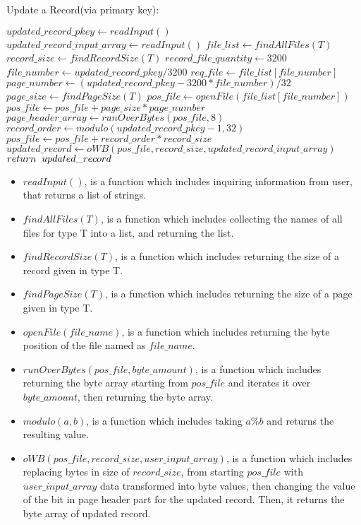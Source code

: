 \documentclass[12pt]{report}
\begin{document}
\begin{algorithm}
\caption{Update a Record(via primary key):}
\begin{algorithmic}[1]
	\STATE $updated\_record\_pkey \leftarrow readInput()$
	\STATE $updated\_record\_input\_array \leftarrow readInput()$
	\STATE $file\_list \leftarrow findAllFiles(T)$
	\STATE $record\_size \leftarrow findRecordSize(T)$
	\STATE $record\_file\_quantity \leftarrow 3200$
	\STATE $file\_number \leftarrow updated\_record\_pkey / 3200$
	\STATE $req\_file \leftarrow file\_list[file\_number]$
	\STATE $page\_number \leftarrow (updated\_record\_pkey - 3200 * file\_number) / 32$
	\STATE $page\_size \leftarrow findPageSize(T)$
	\STATE $pos\_file \leftarrow openFile(file\_list[file\_number])$
	\STATE $pos\_file \leftarrow pos\_file + page\_size * page\_number$
	\STATE $page\_header\_array \leftarrow runOverBytes(pos\_file, 8)$
	\STATE $record\_order \leftarrow modulo(updated\_record\_pkey - 1, 32)$
	\STATE $pos\_file \leftarrow pos\_file + record\_order * record\_size$
	\STATE $updated\_record \leftarrow oWB(pos\_file, record\_size, updated\_record\_input\_array)$
	\STATE $return\hspace{0.2cm}updated\_record$
\end{algorithmic}
\end{algorithm}

\begin{itemize}
\item $readInput()$, is a function which includes inquiring information from user, that returns a list of strings.
\item $findAllFiles(T)$, is a function which includes collecting the names of all files for type T into a list, and returning the list.
\item $findRecordSize(T)$, is a function which includes returning the size of a record given in type T.
\item $findPageSize(T)$, is a function which includes returning the size of a page given in type T.
\item $openFile(file\_name)$, is a function which includes returning the byte position of the file named as $file\_name$.
\item $runOverBytes(pos\_file, byte\_amount)$, is a function which includes returning the byte array starting from $pos\_file$ and iterates it over $byte\_amount$, then returning the byte array.
\item $modulo(a,b)$, is a function which includes taking $a\%b$ and returns the resulting value.
\item $oWB(pos\_file, record\_size, user\_input\_array)$, is a function which includes replacing bytes in size of $record\_size$, from starting $pos\_file$ with \\ 
$user\_input\_array$ data transformed into byte values, then changing the value of the bit in page header part for the updated record. Then, it returns the byte array of updated record.
\end{itemize}
\end{document}
